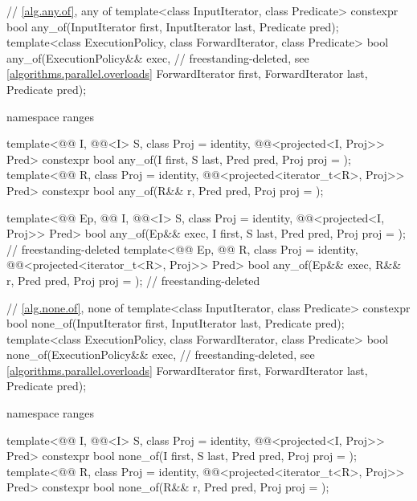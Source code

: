 \begin{codeblock}
{  // \ref{alg.any.of}, any of
  template<class InputIterator, class Predicate>
    constexpr bool any_of(InputIterator first, InputIterator last, Predicate pred);
  template<class ExecutionPolicy, class ForwardIterator, class Predicate>
    bool any_of(ExecutionPolicy&& exec,                         // freestanding-deleted, see \ref{algorithms.parallel.overloads}
                ForwardIterator first, ForwardIterator last, Predicate pred);

  namespace ranges {
    template<@@ I, @@<I> S, class Proj = identity,
             @@<projected<I, Proj>> Pred>
      constexpr bool any_of(I first, S last, Pred pred, Proj proj = {});
    template<@@ R, class Proj = identity,
             @@<projected<iterator_t<R>, Proj>> Pred>
      constexpr bool any_of(R&& r, Pred pred, Proj proj = {});

    template<@@ Ep, @@ I, @@<I> S,
             class Proj = identity, @@<projected<I, Proj>> Pred>
      bool any_of(Ep&& exec, I first, S last, Pred pred, Proj proj = {});   // freestanding-deleted
    template<@@ Ep, @@ R, class Proj = identity,
             @@<projected<iterator_t<R>, Proj>> Pred>
      bool any_of(Ep&& exec, R&& r, Pred pred, Proj proj = {});             // freestanding-deleted
  }

  // \ref{alg.none.of}, none of
  template<class InputIterator, class Predicate>
    constexpr bool none_of(InputIterator first, InputIterator last, Predicate pred);
  template<class ExecutionPolicy, class ForwardIterator, class Predicate>
    bool none_of(ExecutionPolicy&& exec,                        // freestanding-deleted, see \ref{algorithms.parallel.overloads}
                 ForwardIterator first, ForwardIterator last, Predicate pred);

  namespace ranges {
    template<@@ I, @@<I> S, class Proj = identity,
             @@<projected<I, Proj>> Pred>
      constexpr bool none_of(I first, S last, Pred pred, Proj proj = {});
    template<@@ R, class Proj = identity,
             @@<projected<iterator_t<R>, Proj>> Pred>
      constexpr bool none_of(R&& r, Pred pred, Proj proj = {});

}}
\end{codeblock}
